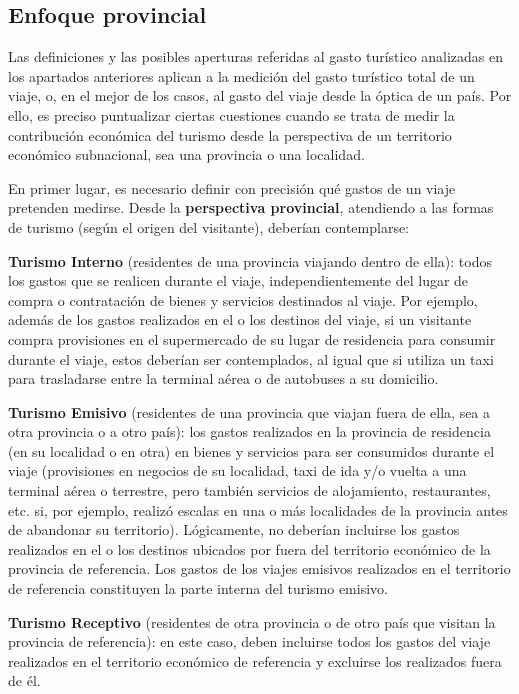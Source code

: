 \documentclass[
]{book}
\begin{document}
\hypertarget{enfoque-provincial}{%
\subsection{Enfoque provincial}\label{enfoque-provincial}}

Las definiciones y las posibles aperturas referidas al gasto turístico analizadas en los apartados anteriores aplican a la medición del gasto turístico total de un viaje, o, en el mejor de los casos, al gasto del viaje desde la óptica de un país. Por ello, es preciso puntualizar ciertas cuestiones cuando se trata de medir la contribución económica del turismo desde la perspectiva de un territorio económico subnacional, sea una provincia o una localidad.

En primer lugar, es necesario definir con precisión qué gastos de un viaje pretenden medirse. Desde la \textbf{perspectiva provincial}, atendiendo a las formas de turismo (según el origen del visitante), deberían contemplarse:

\textbf{Turismo Interno} (residentes de una provincia viajando dentro de ella): todos los gastos que se realicen durante el viaje, independientemente del lugar de compra o contratación de bienes y servicios destinados al viaje. Por ejemplo, además de los gastos realizados en el o los destinos del viaje, si un visitante compra provisiones en el supermercado de su lugar de residencia para consumir durante el viaje, estos deberían ser contemplados, al igual que si utiliza un taxi para trasladarse entre la terminal aérea o de autobuses a su domicilio.

\textbf{Turismo Emisivo} (residentes de una provincia que viajan fuera de ella, sea a otra provincia o a otro país): los gastos realizados en la provincia de residencia (en su localidad o en otra) en bienes y servicios para ser consumidos durante el viaje (provisiones en negocios de su localidad, taxi de ida y/o vuelta a una terminal aérea o terrestre, pero también servicios de alojamiento, restaurantes, etc. si, por ejemplo, realizó escalas en una o más localidades de la provincia antes de abandonar su territorio). Lógicamente, no deberían incluirse los gastos realizados en el o los destinos ubicados por fuera del territorio económico de la provincia de referencia. Los gastos de los viajes emisivos realizados en el territorio de referencia constituyen la parte interna del turismo emisivo.

\textbf{Turismo Receptivo} (residentes de otra provincia o de otro país que visitan la provincia de referencia): en este caso, deben incluirse todos los gastos del viaje realizados en el territorio económico de referencia y excluirse los realizados fuera de él.
\end{document}
